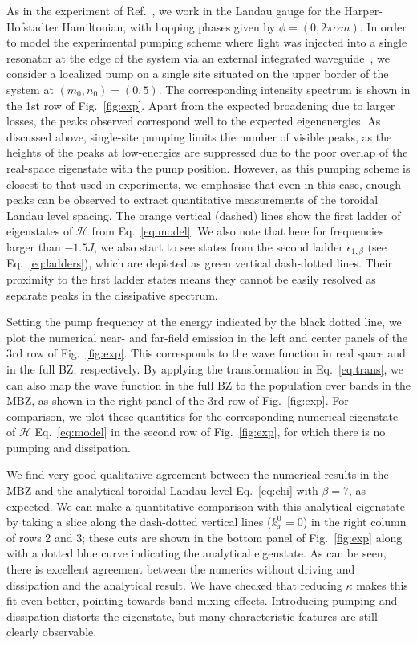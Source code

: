 As in the experiment of Ref.~\cite{hafezi2013imaging}, we work in the
Landau gauge for the Harper-Hofstadter Hamiltonian, with hopping
phases given by $\phi = (0, 2\pi\alpha m)$. In order to model the
experimental pumping scheme where light was injected into a single
resonator at the edge of the system via an external integrated
waveguide~\cite{hafezi2013imaging}, we consider a localized pump on a
single site situated on the upper border of the system at
$(m_0,n_0)= (0,5)$.  The corresponding intensity spectrum is shown in
the 1st row of Fig.~\ref{fig:exp}. Apart from the expected broadening
due to larger losses, the peaks observed correspond well to the
expected eigenenergies.  As discussed above, single-site pumping
limits the number of visible peaks, as the heights of the peaks at
low-energies are suppressed due to the poor overlap of the real-space
eigenstate with the pump position. However, as this pumping scheme is
closest to that used in experiments, we emphasise that even in this
case, enough peaks can be observed to extract quantitative
measurements of the toroidal Landau level spacing. The orange vertical
(dashed) lines show the first ladder of eigenstates of $\mathcal{H}$
from Eq.~\eqref{eq:model}. We also note that here for frequencies
larger than $-1.5 J$, we also start to see states from the second
ladder $\epsilon_{1,\beta}$ (see Eq.~\eqref{eq:ladders}), which are
depicted as green vertical dash-dotted lines. Their proximity to the
first ladder states means they cannot be easily resolved as separate
peaks in the dissipative spectrum.

Setting the pump frequency at the energy indicated by the black dotted
line, we plot the numerical near- and far-field emission in the left
and center panels of the 3rd row of Fig.~\ref{fig:exp}. This
corresponds to the wave function in real space and in the full BZ,
respectively. By applying the transformation in Eq.~\eqref{eq:trans}, we
can also map the wave function in the full BZ to the population over
bands in the MBZ, as shown in the right panel of the 3rd row of
Fig.~\ref{fig:exp}. For comparison, we plot these quantities for the
corresponding numerical eigenstate of $\mathcal{H}$
Eq.~\eqref{eq:model} in the second row of Fig.~\ref{fig:exp}, for
which there is no pumping and dissipation.

We find very good qualitative agreement between the numerical results
in the MBZ and the analytical toroidal Landau level Eq.~\eqref{eq:chi}
with $\beta=7$, as expected. We can make a quantitative comparison with
this analytical eigenstate by taking a slice along the dash-dotted
vertical lines ($k_x^0 = 0$) in the right column of rows 2 and 3;
these cuts are shown in the bottom panel of Fig.~\ref{fig:exp} along
with a dotted blue curve indicating the analytical eigenstate. As can
be seen, there is excellent agreement between the numerics without
driving and dissipation and the analytical result. We have checked
that reducing $\kappa$ makes this fit even better, pointing towards
band-mixing effects. Introducing pumping and dissipation distorts the
eigenstate, but many characteristic features are still clearly
observable.

